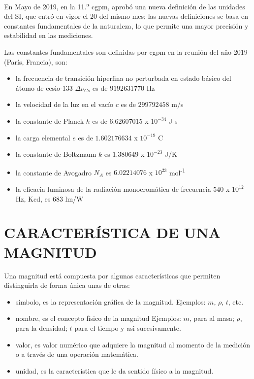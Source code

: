    



  En Mayo de 2019, en la 11.\textsuperscript{a}  \gls{cgpm}, aprobó una nueva definición de las unidades del SI, que entró en vigor el 20 del mismo mes; las nuevas definiciones se basa en constantes fundamentales de la naturaleza, lo que permite una mayor precisión y estabilidad en las mediciones. 

  Las constantes fundamentales son definidas por \gls{cgpm} en la reunión del año 2019 (París, Francia), son:

  \begin{itemize}
    \item la frecuencia de transición hiperfina no perturbada en estado básico del átomo de cesio-133 $\Delta \nu_{Cs}$ es de $9 192 631 770$ Hz
    \item la velocidad de la luz en el vacío $c$ es de $299 792 458$ m/s
    \item la constante de Planck $h$ es de $6.626 070 15$ x $10^{-34}$ J s
    \item la carga elemental $e$ es de $1. 602 176 634$ x $10^{-19}$ C
    \item la constante de Boltzmann $k$ es $1.380 649$ x $10^{-23}$ J/K
    \item la constante de Avogadro $N_A$ es $6.022 140 76$ x $10^{23}$ mol\textsuperscript{-1}
    \item la eficacia luminosa de la radiación monocromática de frecuencia $540$ x $10^{12}$ Hz, Kcd, es 683 lm/W
  \end{itemize}

  \section{CARACTERÍSTICA DE UNA MAGNITUD} %
    Una magnitud está compuesta por algunas características que permiten distinguirla de forma única unas de otras:
    \begin{itemize}
      \item símbolo, es la representación gráfica de la magnitud. Ejemplos: \textbf{$m$}, $\rho$, $t$, etc.
      \item nombre, es el concepto físico de la magnitud Ejemplos: \textbf{$m$}, para al masa; $\rho$, para la densidad; $t$ para el tiempo y asi sucesivamente.
      \item valor, es valor numérico que adquiere la magnitud al momento de la medición o a través de una operación matemática.
      \item unidad, es la característica que le da sentido físico a la magnitud.
    \end{itemize}


